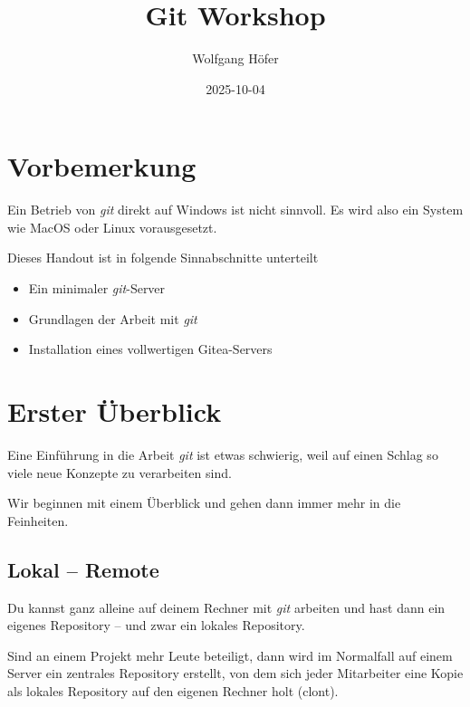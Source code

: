 \documentclass[
  letterpaper,
  DIV=11]{scrreprt}
\title{Git Workshop}
\author{Wolfgang Höfer}
\date{2025-10-04}
\makeatletter
\providecommand{\tightlist}{%
  \setlength{\itemsep}{0pt}\setlength{\parskip}{0pt}}\usepackage{longtable,booktabs,array}
\renewcommand{\maketitle}{\bgroup\setlength{\parindent}{0pt}
\begin{flushleft}
  {\sffamily\huge\textbf{\MakeUppercase{\@title}}} \vspace{0.3cm} \newline
  {\Large {\@subtitle}} \newline
  \@author
\end{flushleft}\egroup
}
\newcommand{\git}{\textit{git}\xspace}
\makeatother
\begin{document}
\maketitle

\pagestyle{mystyle}



\chapter*{Vorbemerkung}\label{vorbemerkung}


Ein Betrieb von \git direkt auf Windows ist nicht sinnvoll. Es wird also
ein System wie MacOS oder Linux vorausgesetzt.

Dieses Handout ist in folgende Sinnabschnitte unterteilt

\begin{itemize}
\tightlist
\item
  Ein minimaler \git-Server
\item
  Grundlagen der Arbeit mit \git
\item
  Installation eines vollwertigen Gitea-Servers
\end{itemize}


\chapter{Erster Überblick}\label{erster-uxfcberblick}

Eine Einführung in die Arbeit \git ist etwas schwierig, weil auf einen
Schlag so viele neue Konzepte zu verarbeiten sind.

Wir beginnen mit einem Überblick und gehen dann immer mehr in die
Feinheiten.

\section{Lokal -- Remote}\label{lokal-remote}

Du kannst ganz alleine auf deinem Rechner mit \git arbeiten und hast
dann ein eigenes Repository -- und zwar ein lokales Repository.

Sind an einem Projekt mehr Leute beteiligt, dann wird im Normalfall auf
einem Server ein zentrales Repository erstellt, von dem sich jeder
Mitarbeiter eine Kopie als lokales Repository auf den eigenen Rechner
holt (clont).
\end{document}

